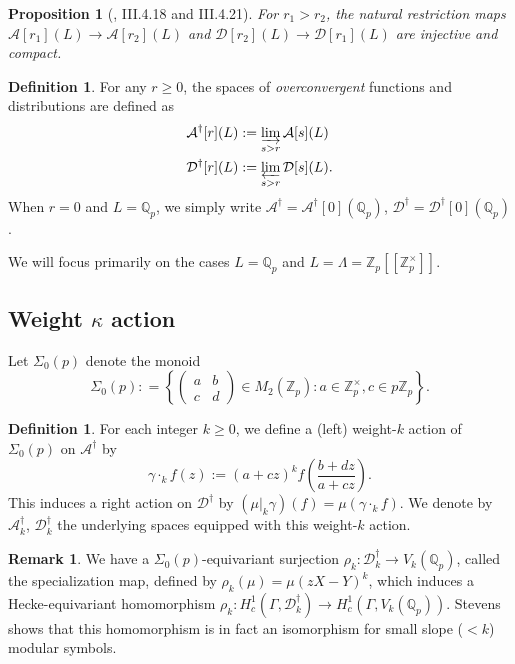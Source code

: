 \documentclass[10pt]{amsart}
\theoremstyle{plain}
\newtheorem{proposition}[theorem]{Proposition}
\theoremstyle{definition}
\newtheorem{definition}[theorem]{Definition}
\newtheorem{remark}[theorem]{Remark}
\newcommand{\ZZ}{{\mathbb{Z}}}
\newcommand{\QQ}{{\mathbb{Q}}}
\newcommand{\cA}{\mathcal{A}}
\newcommand{\cD}{\mathcal{D}}
\begin{document}
\begin{proposition}[\cite{Bellaiche}, III.4.18 and III.4.21] For $r_1> r_2$, the natural restriction maps $\cA[r_1](L)\rightarrow \cA[r_2](L)$  and $\cD[r_2](L)\rightarrow \cD[r_1](L)$ are injective and compact.
\end{proposition}

\begin{definition}
For any $r\geq 0$, the spaces of \emph{overconvergent} functions and distributions are defined as
\begin{align}
	\cA^\dagger[r](L) &:= \varinjlim_{s>r} \cA[s](L)\\
	\cD^\dagger[r](L) &:=\varprojlim_{s>r} \cD[s](L).
\end{align}
When $r=0$ and $L=\QQ_p$, we simply write $\cA^\dagger = \cA^\dagger[0](\QQ_p)$, $\cD^\dagger = \cD^\dagger[0](\QQ_p)$.
\end{definition}
We will focus primarily on the cases $L=\QQ_p$ and $L=\Lambda = \ZZ_p[[\ZZ_p^\times]]$.

\subsection{Weight $\kappa$ action}
Let $\Sigma_0(p)$ denote the monoid
\begin{equation*}
	\Sigma_0(p) : = \left\{ \begin{pmatrix} a & b \\ c & d\end{pmatrix}\in M_2(\ZZ_p) : a\in \ZZ_p^\times, c\in p\ZZ_p\right\}.
\end{equation*}

\begin{definition}
For each integer $k\geq 0$, we define a (left) weight-$k$ action of $\Sigma_0(p)$ on $\cA^\dagger$ by 
\begin{equation}
	\gamma \cdot_k f(z) := (a+cz)^k f\left(\frac{b+dz}{a+cz}\right).
\end{equation}
This induces a right action on $\cD^\dagger$ by $(\mu|_k\gamma) (f) = \mu(\gamma\cdot_k f)$. We denote by $\cA_k^\dagger$, $\cD_k^\dagger$ the underlying spaces equipped with this weight-$k$ action.
\end{definition}

\begin{remark}
We have a $\Sigma_0(p)$-equivariant surjection $\rho_k : \cD_k^\dagger\rightarrow V_k(\QQ_p)$, called the specialization map, defined by $\rho_k(\mu) = \mu( zX-Y)^k$, which induces a Hecke-equivariant homomorphism $\rho_k : H_c^1(\Gamma, \cD^\dagger_k)\rightarrow H^1_c (\Gamma, V_k(\QQ_p))$. Stevens shows \cite{Stevens} that this homomorphism is in fact an isomorphism for small slope ($<k$) modular symbols. 
\end{remark}
\end{document}
